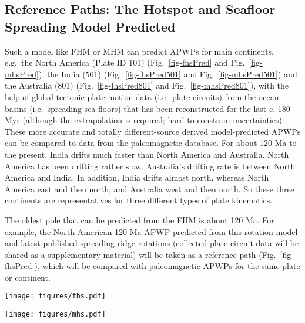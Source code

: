 \subsection{Reference Paths: The Hotspot and Seafloor Spreading Model Predicted}

Such a model like FHM or MHM can predict APWPs for main continents, e.g.\ the
North America (Plate ID 101) (Fig.~\ref{fig-fhsPred} and
Fig.~\ref{fig-mhsPred}), the India (501) (Fig.~\ref{fig-fhsPred501} and
Fig.~\ref{fig-mhsPred501}) and the Australia (801) (Fig.~\ref{fig-fhsPred801}
and Fig.~\ref{fig-mhsPred801}), with the help of global tectonic plate motion
data (i.e.\ plate circuits) from the ocean basins (i.e.\ spreading sea floors)
that has been reconstructed for the last c. 180 Myr (although the
extrapolation is required; hard to constrain uncertainties). These more accurate
and totally different-source derived model-predicted APWPs can be compared to
data from the paleomagnetic database. For about 120 Ma to the present, India
drifts much faster than North America and Australia. North America has been
drifting rather slow. Australia's drifting rate is between North America and
India. In addition, India drifts almost north, whereas North America east and
then north, and Australia west and then north. So these three continents are
representatives for three different types of plate kinematics.

The oldest pole that can be predicted from the FHM is about 120 Ma. For example,
the North American 120 Ma APWP predicted from this rotation model
and latest published spreading ridge rotations (collected plate circuit data
will be shared as a supplementary material) will be taken as a reference path
(Fig.~\ref{fig-fhsPred}), which will be compared with paleomagnetic APWPs for
the same plate or continent.

\begin{figure*}
\centering
\texttt{[image: figures/fhs.pdf]}
\caption[120 Ma FHM predicted APWP of North America]{FHM
predicted 120 Ma APWP for $NAC$ through the North
America\textendash{}Nubia\textendash{}Mantle plate circuit. Its age step is 5
Myr.}\label{fig-fhsPred}
\end{figure*}

\begin{figure*}
\centering
\texttt{[image: figures/mhs.pdf]}
\caption[120 Ma MHM predicted APWP of North America]{MHM
predicted 120 Ma APWP for $NAC$ through the North
America\textendash{}Nubia\textendash{}Mantle plate circuit. Its age step is 5
Myr. The dashed line is the FHM predicted path shown in
Fig.~\ref{fig-fhsPred}.}\label{fig-mhsPred}
\end{figure*}

